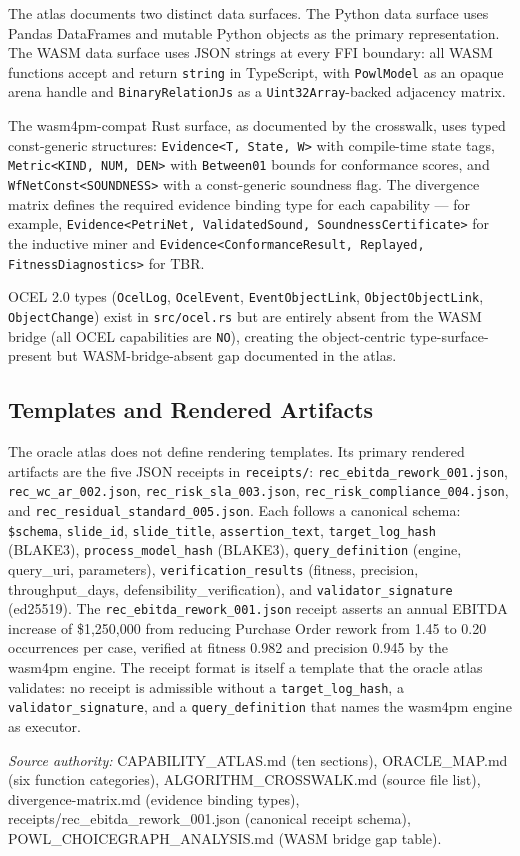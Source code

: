 The atlas documents two distinct data surfaces. The Python data surface uses
Pandas DataFrames and mutable Python objects as the primary representation. The WASM data
surface uses JSON strings at every FFI boundary: all WASM functions accept and return
\texttt{string} in TypeScript, with \texttt{PowlModel} as an opaque arena handle and
\texttt{BinaryRelationJs} as a \texttt{Uint32Array}-backed adjacency matrix.

The wasm4pm-compat Rust surface, as documented by the crosswalk, uses typed const-generic
structures: \texttt{Evidence<T, State, W>} with compile-time state tags, \texttt{Metric<KIND, NUM, DEN>}
with \texttt{Between01} bounds for conformance scores, and \texttt{WfNetConst<SOUNDNESS>}
with a const-generic soundness flag. The divergence matrix defines the required evidence
binding type for each capability --- for example,
\texttt{Evidence<PetriNet, ValidatedSound, SoundnessCertificate>} for the inductive miner
and \texttt{Evidence<ConformanceResult, Replayed, FitnessDiagnostics>} for TBR.

OCEL 2.0 types (\texttt{OcelLog}, \texttt{OcelEvent}, \texttt{EventObjectLink},
\texttt{ObjectObjectLink}, \texttt{ObjectChange}) exist in \texttt{src/ocel.rs} but are
entirely absent from the WASM bridge (all OCEL capabilities are \texttt{NO}), creating
the object-centric type-surface-present but WASM-bridge-absent gap documented in the
atlas.

\subsection{Templates and Rendered Artifacts}
\label{sec:sources-pm4py-impl-templates}

The oracle atlas does not define rendering templates. Its primary rendered artifacts are
the five JSON receipts in \texttt{receipts/}: \texttt{rec\_ebitda\_rework\_001.json},
\texttt{rec\_wc\_ar\_002.json}, \texttt{rec\_risk\_sla\_003.json},
\texttt{rec\_risk\_compliance\_004.json}, and \texttt{rec\_residual\_standard\_005.json}.
Each follows a canonical schema: \texttt{\$schema}, \texttt{slide\_id},
\texttt{slide\_title}, \texttt{assertion\_text}, \texttt{target\_log\_hash} (BLAKE3),
\texttt{process\_model\_hash} (BLAKE3), \texttt{query\_definition} (engine, query\_uri,
parameters), \texttt{verification\_results} (fitness, precision, throughput\_days,
defensibility\_verification), and \texttt{validator\_signature} (ed25519). The
\texttt{rec\_ebitda\_rework\_001.json} receipt asserts an annual EBITDA increase of
\$1,250,000 from reducing Purchase Order rework from 1.45 to 0.20 occurrences per case,
verified at fitness 0.982 and precision 0.945 by the wasm4pm engine. The receipt format
is itself a template that the oracle atlas validates: no receipt is admissible without a
\texttt{target\_log\_hash}, a \texttt{validator\_signature}, and a \texttt{query\_definition}
that names the wasm4pm engine as executor.

\bigskip
\noindent\textit{Source authority:} CAPABILITY\_ATLAS.md (ten sections), ORACLE\_MAP.md
(six function categories), ALGORITHM\_CROSSWALK.md (source file list),
divergence-matrix.md (evidence binding types), receipts/rec\_ebitda\_rework\_001.json
(canonical receipt schema), POWL\_CHOICEGRAPH\_ANALYSIS.md (WASM bridge gap table).
